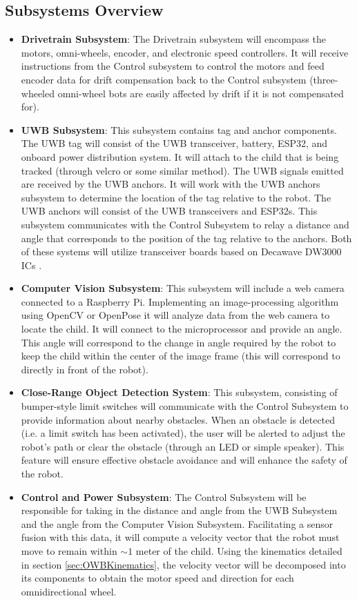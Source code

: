 \documentclass[journal,onecolumn, draftclsnofoot, 12pt]{IEEEtran}
\begin{document}
\subsection{Subsystems Overview}
\begin{itemize}
    \item \textbf{Drivetrain Subsystem}: The Drivetrain subsystem will encompass the motors, omni-wheels, encoder, and electronic speed controllers. It will receive instructions from the Control subsystem to control the motors and feed encoder data for drift compensation back to the Control subsystem (three-wheeled omni-wheel bots are easily affected by drift if it is not compensated for).
    \item \textbf{UWB Subsystem}: This subsystem contains tag and anchor components. The UWB tag will consist of the UWB transceiver, battery, ESP32, and onboard power distribution system. It will attach to the child that is being tracked (through velcro or some similar method). The UWB signals emitted are received by the UWB anchors. It will work with the UWB anchors subsystem to determine the location of the tag relative to the robot. The UWB anchors will consist of the UWB transceivers and ESP32s. This subsystem communicates with the Control Subsystem to relay a distance and angle that corresponds to the position of the tag relative to the anchors. Both of these systems will utilize transceiver boards based on Decawave DW3000 ICs \cite{9881375}.
    \item \textbf{Computer Vision Subsystem}: This subsystem will include a web camera connected to a Raspberry Pi. Implementing an image-processing algorithm using OpenCV or OpenPose it will analyze data from the web camera to locate the child. It will connect to the microprocessor and provide an angle. This angle will correspond to the change in angle required by the robot to keep the child within the center of the image frame (this will correspond to directly in front of the robot).
    \item \textbf{Close-Range Object Detection System}: This subsystem, consisting of bumper-style limit switches will communicate with the Control Subsystem to provide information about nearby obstacles. When an obstacle is detected (i.e. a limit switch has been activated), the user will be alerted to adjust the robot's path or clear the obstacle (through an LED or simple speaker). This feature will ensure effective obstacle avoidance and will enhance the safety of the robot.
    \item \textbf{Control and Power Subsystem}: The Control Subsystem will be responsible for taking in the distance and angle from the UWB Subsystem and the angle from the Computer Vision Subsystem. Facilitating a sensor fusion with this data, it will compute a velocity vector that the robot must move to remain within $\sim 1$ meter of the child. Using the kinematics detailed in section \ref{sec:OWBKinematics}, the velocity vector will be decomposed into its components to obtain the motor speed and direction for each omnidirectional wheel. 
    

\end{itemize}
\end{document}
